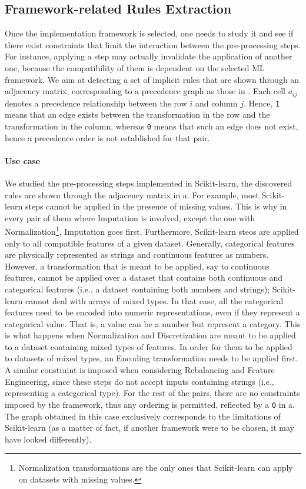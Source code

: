 \subsection{Framework-related Rules Extraction}
\label{effective-ssec:rules-framework}

Once the implementation framework is selected, one needs to study it and see if there exist constraints that limit the interaction between the pre-processing steps.
For instance, applying a step may actually invalidate the application of another one, because the compatibility of them is dependent on the selected ML framework.
We aim at detecting a set of implicit rules that are shown through an adjacency matrix, corresponding to a precedence graph as those in .
Each cell $a_{ij}$ denotes a precedence relationship between the row $i$ and column $j$.
Hence, \texttt{1} means that an edge exists between the transformation in the row and the transformation in the column, whereas \texttt{0} means that such an edge does not exist, hence a precedence order is not established for that pair.

\paragraph{Use case}
We studied the pre-processing steps implemented in Scikit-learn, the discovered rules are shown through the adjacency matrix in a.
For example, most Scikit-learn steps cannot be applied in the presence of missing values.
This is why in every pair of them where Imputation is involved, except the one with Normalization\footnote{Normalization transformations are the only ones that Scikit-learn can apply on datasets with missing values.}, Imputation goes first.
Furthermore, Scikit-learn steos are applied only to all compatible features of a given dataset.
Generally, categorical features are physically represented as strings and continuous features as numbers.
However, a transformation that is meant to be applied, say to continuous features, cannot be applied over a dataset that contains both continuous and categorical features (i.e., a dataset containing both numbers and strings); Scikit-learn cannot deal with arrays of mixed types.
In that case, all the categorical features need to be encoded into numeric representations, even if they represent a categorical value.
That is, a value can be a number but represent a category.
This is what happens when Normalization and Discretization are meant to be applied to a dataset containing mixed types of features.
In order for them to be applied to datasets of mixed types, an Encoding transformation needs to be applied first.
A similar constraint is imposed when considering Rebalancing and Feature Engineering, since these steps do not accept inputs containing strings (i.e., representing a categorical type).
For the rest of the pairs, there are no constraints imposed by the framework, thus any ordering is permitted, reflected by a \texttt{0} in a.
The graph obtained in this case exclusively corresponds to the limitations of Scikit-learn (as a matter of fact, if another framework were to be chosen, it may have looked differently).

